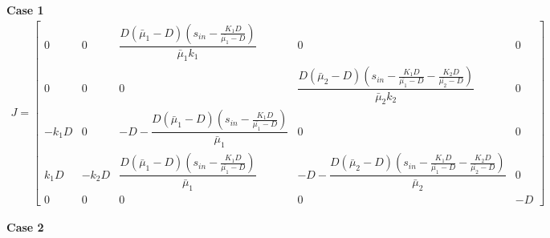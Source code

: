 \documentclass[]{report}
\begin{document}
\textbf{Case 1}
\begin{align}
J = \begin{bmatrix}
0 & 0 &\dfrac{D(\bar{\mu}_1 - D)(s_{in}-\frac{K_1D}{\bar{\mu_1}-D})}{\bar{\mu}_1k_1} &0 &0 \\
0 & 0 & 0&  \dfrac{D(\bar{\mu}_2 - D)(s_{in}-\frac{K_1D}{\bar{\mu_1}-D} -\frac{K_2D}{\bar{\mu_2}-D})}{\bar{\mu}_2k_2} & 0 \\
-k_1D & 0& -D-\dfrac{D(\bar{\mu}_1 - D)(s_{in}-\frac{K_1D}{\bar{\mu_1}-D})}{\bar{\mu}_1} &0 &0 \\
k_1D & -k_2D & \dfrac{D(\bar{\mu}_1 - D)(s_{in}-\frac{K_1D}{\bar{\mu_1}-D})}{\bar{\mu}_1} & -D -\dfrac{D(\bar{\mu}_2 - D)(s_{in}-\frac{K_1D}{\bar{\mu_1}-D} -\frac{K_2D}{\bar{\mu_2}-D})}{\bar{\mu}_2} &0 \\
0 & 0 & 0 & 0 & -D 
\end{bmatrix}
\end{align}

\textbf{Case 2}
\end{document}
